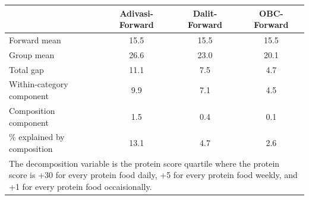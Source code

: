 \begin{tabular}{l*{3}{c}}
\hline\hline
            &\multicolumn{1}{c}{Adivasi-Forward}&\multicolumn{1}{c}{Dalit-Forward}&\multicolumn{1}{c}{OBC-Forward}\\
\hline
\hline
Forward mean&        15.5&        15.5&        15.5\\
Group mean  &        26.6&        23.0&        20.1\\
Total gap   &        11.1&         7.5&         4.7\\
Within-category component&         9.9&         7.1&         4.5\\
Composition component&         1.5&         0.4&         0.1\\
\% explained by composition&        13.1&         4.7&         2.6\\
\hline\hline
\multicolumn{4}{l}{\footnotesize \parbox[t]{0.95\linewidth}{The decomposition variable is the protein score quartile where the protein score is +30 for every protein food daily, +5 for every protein food weekly, and +1 for every protein food occaisionally.}}\\
\end{tabular}
